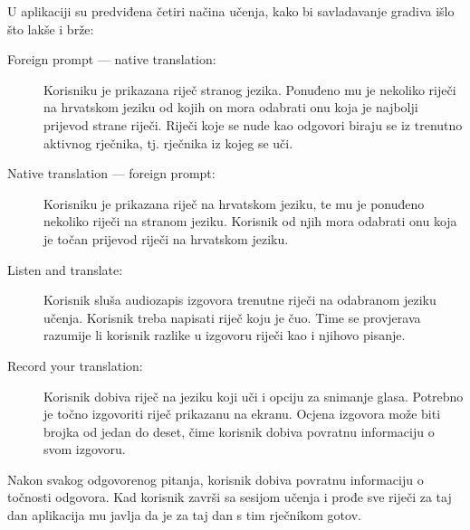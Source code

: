 U aplikaciji su predviđena četiri načina učenja, kako bi savladavanje gradiva išlo što lakše i brže:
\begin{description}
	\item[Foreign prompt --- native translation:] Korisniku je prikazana riječ stranog jezika. Ponuđeno mu je nekoliko riječi na hrvatskom jeziku od kojih on mora odabrati onu koja je najbolji prijevod strane riječi. Riječi koje se nude kao odgovori biraju se iz trenutno aktivnog rječnika, tj. rječnika iz kojeg se uči. 
	\item[Native translation --- foreign prompt:] Korisniku je prikazana riječ na hrvatskom jeziku, te mu je ponuđeno nekoliko riječi na stranom jeziku. Korisnik od njih mora odabrati onu koja je točan prijevod riječi na hrvatskom jeziku.
	\item[Listen and translate:] Korisnik sluša audiozapis izgovora trenutne riječi na odabranom jeziku učenja. Korisnik treba napisati riječ koju je čuo. Time se provjerava razumije li korisnik razlike u izgovoru riječi kao i njihovo pisanje.
	\item[Record your translation:] Korisnik dobiva riječ na jeziku koji uči i opciju za snimanje glasa. Potrebno je točno izgovoriti riječ prikazanu na ekranu. Ocjena izgovora može biti brojka od jedan do deset, čime korisnik dobiva povratnu informaciju o svom izgovoru.
\end{description}

Nakon svakog odgovorenog pitanja, korisnik dobiva povratnu informaciju o točnosti odgovora. Kad korisnik završi sa sesijom učenja i prođe sve riječi za taj dan aplikacija mu javlja da je za taj dan s tim rječnikom gotov. 

\eject
